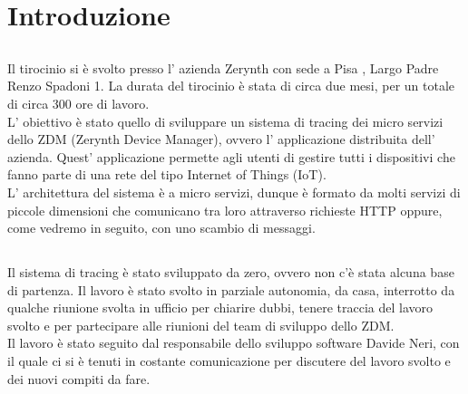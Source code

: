 \documentclass[a4paper,12pt,titlepage,italian,openany]{report}
\begin{document}
\begin{frontespizio}
\end{frontespizio}

\tableofcontents

\chapter{Introduzione}
\section{}
Il tirocinio si è  svolto presso l' azienda Zerynth con sede a Pisa , Largo Padre Renzo Spadoni 1.
La durata del tirocinio è stata di circa due mesi, per un totale di circa 300 ore di lavoro.
\\
L' obiettivo è stato quello di sviluppare un sistema di tracing dei micro servizi dello ZDM\cite{zdm:1} (Zerynth Device Manager), ovvero
l' applicazione distribuita dell' azienda. Quest' applicazione permette agli utenti di gestire tutti i dispositivi che fanno parte di una rete del tipo
Internet of Things (IoT).\\
L' architettura del sistema \`e a micro servizi, dunque è formato da molti servizi di piccole dimensioni che comunicano tra loro attraverso richieste HTTP oppure,
come vedremo in seguito, con uno scambio di messaggi. 

\section{}
Il sistema di tracing \`e stato sviluppato da zero, ovvero non c'è stata alcuna base di partenza. Il lavoro è stato svolto in parziale autonomia,
da casa, interrotto da qualche riunione svolta in ufficio per chiarire dubbi, tenere traccia del lavoro svolto e per partecipare alle riunioni del team di sviluppo dello ZDM\cite{zdm:1}.\\
Il lavoro è stato seguito dal responsabile dello sviluppo software Davide Neri, con il quale ci si è tenuti in costante comunicazione per discutere del lavoro svolto e dei nuovi compiti da fare.
\end{document}
